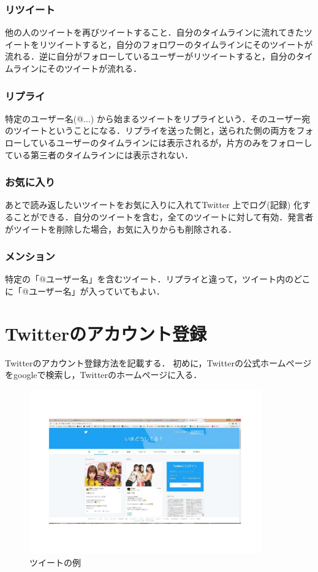 \subsubsection*{リツイート}
他の人のツイートを再びツイートすること．自分のタイムラインに流れてきたツイートをリツイートすると，自分のフォロワーのタイムラインにそのツイートが流れる．逆に自分がフォローしているユーザーがリツイートすると，自分のタイムラインにそのツイートが流れる．


\subsubsection*{リプライ}
特定のユーザー名(@...) から始まるツイートをリプライという．そのユーザー宛のツイートということになる．リプライを送った側と，送られた側の両方をフォローしているユーザーのタイムラインには表示されるが，片方のみをフォローしている第三者のタイムラインには表示されない．


\subsubsection*{お気に入り}
あとで読み返したいツイートをお気に入りに入れてTwitter 上でログ(記録) 化することができる．自分のツイートを含む，全てのツイートに対して有効．発言者がツイートを削除した場合，お気に入りからも削除される．

\subsubsection*{メンション}
特定の「@ユーザー名」を含むツイート．リプライと違って，ツイート内のどこに「@ユーザー名」が入っていてもよい．

\section{Twitterのアカウント登録}
Twitterのアカウント登録方法を記載する．
初めに，Twitterの公式ホームぺージをgoogleで検索し，Twitterのホームページに入る．

\clearpage

\begin{figure}[htb]
\centering
\includegraphics[width=10cm]{twitter10.pdf}
\caption{ツイートの例}\label{ace}
\end{figure}



